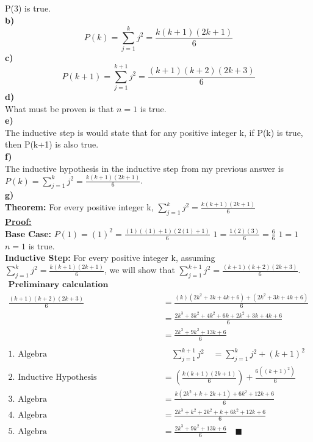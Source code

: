 \documentclass[12pt, letterpaper, twoside]{article}
\begin{document}
\indent P(3) is true.\\
\break
\textbf{b)}\\
\break
\[P(k) = \sum_{j=1}^{k}j^2 = \frac{k(k + 1)(2k + 1)}{6}\]
\break
\textbf{c)}\\
\[P(k+1) = \sum_{j=1}^{k+1}j^2 = \frac{(k+1)(k + 2)(2k + 3)}{6}\]
\break
\textbf{d)}\\
\break
\indent What must be proven is that $n = 1$ is true.\\
\break
\textbf{e)}\\
\break
\indent The inductive step is would state that for any positive integer k, if P(k) is true, then P(k+1) is also true.\\
\break
\textbf{f)}\\
\break
\indent The inductive hypothesis in the inductive step from my previous answer is $P(k) = \sum_{j=1}^{k}j^2 = \frac{k(k + 1)(2k + 1)}{6}$.\\
\break
\newpage\noindent\textbf{g)}\\
\break
\noindent\textbf{Theorem:} For every positive integer k, $\sum_{j=1}^{k}j^2 = \frac{k(k + 1)(2k + 1)}{6}$\\
\break
\noindent\textbf{\underline{Proof:}}\\
\break
\noindent\textbf{Base Case:}
$P(1) = (1)^2 = \frac{(1)((1) + 1)(2(1) + 1)}{6}$
$1 = \frac{1(2)(3)}{6} = \frac{6}{6}$
$1 = 1$
$n = 1$ is true.\\
\break
\noindent\textbf{Inductive Step:} For every positive integer k, assuming $\sum_{j=1}^{k}j^2 = \frac{k(k + 1)(2k + 1)}{6}$, we will show that $\sum_{j=1}^{k+1}j^2 = \frac{(k+1)(k + 2)(2k + 3)}{6}$.
\begin{align*}
\textbf{Preliminary calculation (simplifying):}\\
\frac{(k+1)(k+2)(2k+3)}{6} &= \frac{(k)(2k^2 + 3k + 4k + 6) + (2k^2 + 3k + 4k + 6)}{6}\\
&= \frac{2k^3 + 3k^2 + 4k^2 + 6k + 2k^2 + 3k + 4k + 6}{6}\\
&= \frac{2k^3 + 9k^2 + 13k + 6}{6}\\
\\
\text{1. Algebra}  \qquad& \quad\sum_{j=1}^{k+1}j^2 \quad = \sum_{j=1}^{k}j^2 + (k+1)^2\\
\text{2. Inductive Hypothesis} \qquad &= (\frac{k(k + 1)(2k + 1)}{6}) + \frac{6((k+1)^2)}{6}\\
\text{3. Algebra} \qquad &= \frac{k(2k^2 + k + 2k + 1) + 6k^2 + 12k + 6}{6}\\
\text{4. Algebra} \qquad &= \frac{2k^3 + k^2 + 2k^2 + k + 6k^2 + 12k + 6}{6}\\
\text{5. Algebra} \qquad &= \frac{2k^3 + 9k^2 + 13k + 6}{6} \quad\blacksquare\\
\end{align*}
\end{document}
